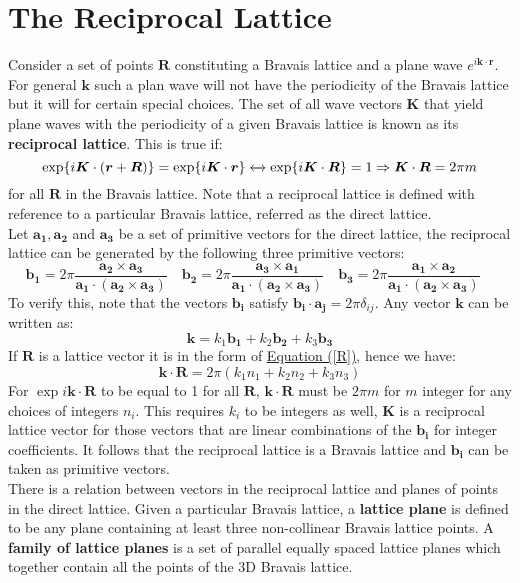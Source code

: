 \documentclass[10.75pt,a4paper,openright,bottom=2cm]{article}
\renewcommand{\Vec}[1]{\boldsymbol{#1}}
\begin{document}
\section{The Reciprocal Lattice}
Consider a set of points $\Vec{R}$ constituting a Bravais lattice and a plane wave $e^{i\Vec{k}\cdot\Vec{r}}$. For general $\Vec{k}$ such a plan wave will not have the periodicity of the Bravais lattice but it will for certain special choices. The set of all wave vectors $\Vec{K}$ that yield plane waves with the periodicity of a given Bravais lattice is known as its \textbf{reciprocal lattice}. This is true if:
\[
\exp{i\Vec{K}\cdot(\Vec{r}+\Vec{R})}=\exp{i\Vec{K}\cdot\Vec{r}}\xleftrightarrow{}\exp{i\Vec{K}\cdot\Vec{R}}=1\Rightarrow\Vec{K}\cdot\Vec{R}=2\pi m
\]
for all $\Vec{R}$ in the Bravais lattice. Note that a reciprocal lattice is defined with reference to a particular Bravais lattice, referred as the direct lattice.\\
Let $\Vec{a_1},\Vec{a_2}$ and $\Vec{a_3}$ be a set of primitive vectors for the direct lattice, the reciprocal lattice can be generated by the following three primitive vectors:
\[
\Vec{b_1}=2\pi\frac{\Vec{a_2}\times\Vec{a_3}}{\Vec{a_1}\cdot(\Vec{a_2}\times\Vec{a_3})} \quad
\Vec{b_2}=2\pi\frac{\Vec{a_3}\times\Vec{a_1}}{\Vec{a_1}\cdot(\Vec{a_2}\times\Vec{a_3})}\quad
\Vec{b_3}=2\pi\frac{\Vec{a_1}\times\Vec{a_2}}{\Vec{a_1}\cdot(\Vec{a_2}\times\Vec{a_3})}\quad
\]
To verify this, note that the vectors $\Vec{b_i}$ satisfy $\Vec{b_i}\cdot\Vec{a_j}=2\pi\delta_{ij}$. Any vector $\Vec{k}$ can be written as:
\[
\Vec{k}=k_1\Vec{b_1}+k_2\Vec{b_2}+k_3\Vec{b_3}
\]
If $\Vec{R}$ is a lattice vector it is in the form of \hyperref[R]{Equation (\ref{R})}, hence we have:
\[
\Vec{k}\cdot\Vec{R}=2\pi(k_1n_1+k_2n_2+k_3n_3)
\]
For $\exp{i\Vec{k}\cdot\Vec{R}}$ to be equal to 1 for all $\Vec{R}$, $\Vec{k}\cdot\Vec{R}$ must be $2\pi m$ for $m$ integer for any choices of integers $n_i$. This requires $k_i$ to be integers as well, $\Vec{K}$ is a reciprocal lattice vector for those vectors that are linear combinations of the $\Vec{b_i}$ for integer coefficients. It follows that the reciprocal lattice is a Bravais lattice and $\Vec{b_i}$ can be taken as primitive vectors.\\
There is a relation between vectors in the reciprocal lattice and planes of points in the direct lattice. Given a particular Bravais lattice, a \textbf{lattice plane} is defined to be any plane containing at least three non-collinear Bravais lattice points. A \textbf{family of lattice planes} is a set of parallel equally spaced lattice planes which together contain all the points of the 3D Bravais lattice.\\
\end{document}
